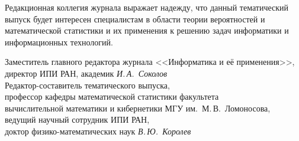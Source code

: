 {{{\smallskip

Редакционная коллегия журнала выражает надежду, что данный тематический  выпуск 
будет интересен специалистам в области теории вероятностей и математической статистики 
и их применения к решению задач информатики и информационных технологий.
     
     \vspace*{20mm}
     \noindent
     Заместитель главного редактора журнала <<Информатика и её 
применения>>,\\
     директор ИПИ РАН, академик  \hfill
     \textit{И.\,А.~Соколов}\\
     
     \noindent
     Редактор-составитель тематического выпуска,\\
     профессор кафедры математической статистики факультета\\
      вычислительной математики и кибернетики МГУ им.\ М.\,В.~Ломоносова,\\
     ведущий научный сотрудник ИПИ РАН,\\ 
доктор физико-математических наук \hfill
      \textit{В.\,Ю.~Королев}
     
     } }
     }